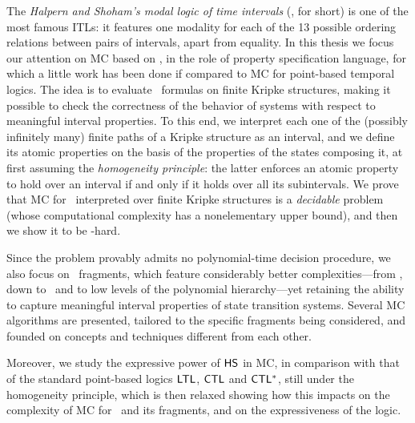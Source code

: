 The \emph{Halpern
and Shoham's modal logic of time intervals} (\HS, for short) is one of the most famous ITLs:
it features one modality for each of the 13 possible ordering
relations between pairs of intervals, apart from equality.
In this thesis we focus our attention on MC based on \HS , in the role of property specification language,
for which a little work has been done if compared to MC for point-based temporal logics.
The idea is to evaluate \HS\ formulas on finite Kripke structures, making it
possible to check the correctness of the behavior of systems with respect to 
meaningful interval properties.
To this end, we interpret each one of the (possibly infinitely many) finite paths of a Kripke structure as an interval, 
and we define its atomic properties on the basis of the properties of the states composing it,
at first assuming the \emph{homogeneity principle}: the latter enforces an atomic property to hold over an interval if and only if it holds over all its subintervals.
%
We prove that MC for \HS\ interpreted over finite Kripke structures is a \emph{decidable} problem (whose computational complexity has a nonelementary upper bound), and
then we show it to be \EXPSPACE-hard.

Since the problem provably admits no polynomial-time decision procedure, we also focus on \HS\ fragments, which 
feature considerably better complexities---from \EXPSPACE, down to \Psp\ and to low levels of the polynomial hierarchy---yet retaining the ability to capture meaningful interval properties of state transition systems.
Several MC algorithms are presented, tailored to the specific fragments being considered, and founded on concepts and techniques different from each other.

Moreover, we study the expressive power of $\text{\sffamily HS}$ in MC, in comparison with that of the standard point-based logics $\text{\sffamily LTL}$, $\text{\sffamily CTL}$ and $\text{\sffamily CTL$^{*}$}$, still under the homogeneity principle, which is then relaxed showing how this impacts on the complexity of MC for \HS\ and its fragments, and on the expressiveness of the logic.

